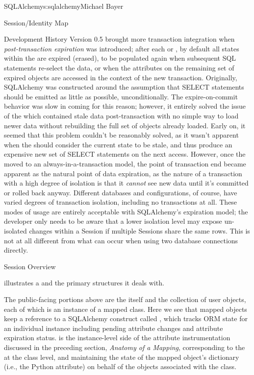 \begin{aosachapter}{SQLAlchemy}{s:sqlalchemy}{Michael Bayer}
\begin{aosasect1}{Session/Identity Map}
\begin{aosasect2}{Development History}
Version 0.5 brought more transaction integration when \emph{post-transaction
expiration} was introduced; after each  or , by
default all states within the  are expired (erased), to be populated
again when subsequent SQL statements re-select the data, or when the
attributes on the remaining set of expired objects are accessed in the
context of the new transaction. Originally, SQLAlchemy was constructed around
the assumption that SELECT statements should be emitted as little as possible,
unconditionally. The expire-on-commit behavior was slow in coming for this
reason; however, it entirely solved the issue of the  which
contained stale data post-transaction with no simple way to load newer data
without rebuilding the full set of objects already loaded. Early on, it seemed
that this problem couldn't be reasonably solved, as it wasn't apparent when
the  should consider the current state to be stale, and thus
produce an expensive new set of SELECT statements on the next access.
However, once the  moved to an always-in-a-transaction model,
the point of transaction end became apparent as the natural point of
data expiration, as the nature of a transaction with a high degree
of isolation is that it \emph{cannot} see new data until it's committed
or rolled back anyway.  Different databases and configurations, of course,
have varied degrees of transaction isolation, including no transactions at all.
These modes of usage are entirely acceptable with SQLAlchemy's expiration
model; the developer only needs to be aware that a lower isolation
level may expose un-isolated changes within a Session if multiple Sessions
share the same rows.  This is not at all different from what can
occur when using two database connections directly.

\end{aosasect2}

\begin{aosasect2}{Session Overview}

 illustrates a  and the primary structures it deals with.


The public-facing portions above are the  itself and the collection of user objects,
each of which is an instance of a mapped class.    Here we see that mapped objects keep
a reference to a SQLAlchemy construct called , which tracks ORM
state for an individual instance including pending attribute changes and attribute
expiration status.   
is the instance-level side of the attribute instrumentation discussed in the preceding
section, \emph{Anatomy of a Mapping}, corresponding to the  at the class level,
and maintaining the state of the mapped object's dictionary (i.e., the Python 
attribute) on behalf of the  objects associated with the class.


\end{aosasect2}
\end{aosasect1}
\end{aosachapter}
